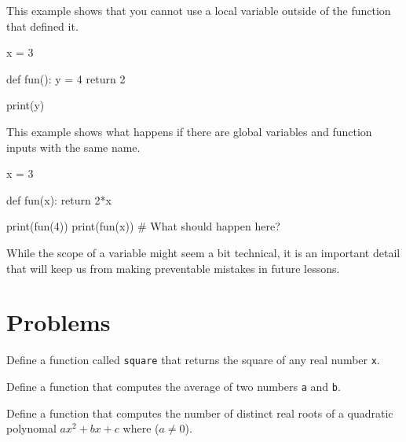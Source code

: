 \documentclass{ximera}
\begin{document}
This example shows that you cannot use a local variable outside of the function that defined it.

\begin{sageCell}
x = 3

def fun():
        y = 4
        return 2

print(y)
\end{sageCell}

This example shows what happens if there are global variables and function inputs with the same name.

\begin{sageCell}
x = 3

def fun(x):
	return 2*x

print(fun(4))
print(fun(x))     # What should happen here?
\end{sageCell}

While the scope of a variable might seem a bit technical, it is an important detail that will keep us from making preventable mistakes in future lessons.

\section{Problems}

\begin{question}
	Define a function called \verb|square| that returns the square of any real number \verb|x|. 
\end{question}

\begin{question}
	Define a function that computes the average of two numbers \verb|a| and \verb|b|.
\end{question}

\begin{question}
	Define a function that computes the number of distinct real roots of a quadratic polynomal $ax^2+bx+c$ where ($a\neq 0$).
\end{question}
\end{document}
